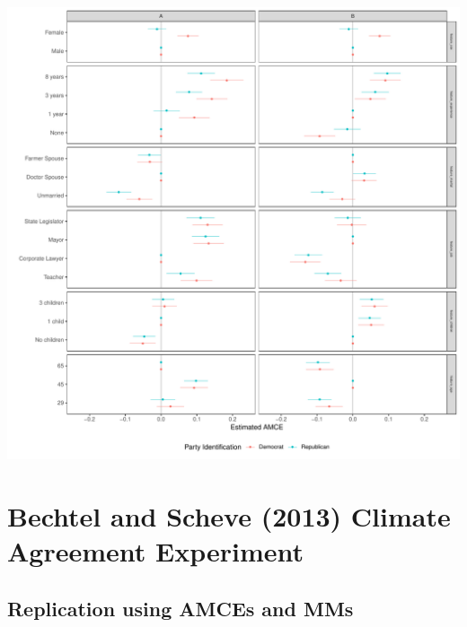 \documentclass[a4paper,12pt]{article}\usepackage[]{graphicx}\usepackage[]{color}
\makeatletter
\def\maxwidth{ %
  \ifdim\Gin@nat@width>\linewidth
    \linewidth
  \else
    \Gin@nat@width
  \fi
}
\newenvironment{knitrout}{}{} %
\makeatother
\begin{document}
\begin{knitrout}
\color{fgcolor}
\includegraphics[width=\maxwidth]{figure/tkr_subgroup_example_plot-1} 

\end{knitrout}


\clearpage

\section{Bechtel and Scheve (2013) Climate Agreement Experiment}\label{app:bechtel}

\subsection{Replication using AMCEs and MMs}
\end{document}
